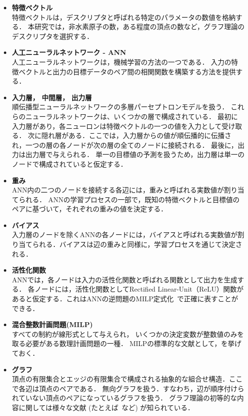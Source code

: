 \documentclass[11pt, titlepage, dvipdfmx, twoside]{jarticle}
\newcommand{\target}{目標}
\begin{document}
\begin{itemize}

\item {\bf 特徴ベクトル}\\
%
特徴ベクトルは，デスクリプタと呼ばれる特定のパラメータの数値を格納する．
本研究では，非水素原子の数，ある程度の頂点の数など，グラフ理論のデスクリプタを選択する．

\item {\bf 人工ニューラルネットワーク - ANN}\\
%
人工ニューラルネットワークは，機械学習の方法の一つである．
入力の特徴ベクトルと出力の\target データのペア間の相関関数を構築する方法を提供する．


\item {\bf 入力層， 中間層， 出力層}\\
%
順伝播型ニューラルネットワークの多層パーセプトロンモデルを扱う．
これらのニューラルネットワークは、いくつかの層で構成されている．
最初に入力層があり，各ニューロンは特徴ベクトルの一つの値を入力として受け取る．
次に隠れ層がある．ここでは，入力層からの値が順伝播的に伝播され，一つの層の各ノードが次の層の全てのノードに接続される．
最後に，出力は出力層で与えられる．
単一の\target 値の予測を扱うため，出力層は単一のノードで構成されていると仮定する．

\item {\bf 重み}\\
%
ANN内の二つのノードを接続する各辺には，重みと呼ばれる実数値が割り当てられる．
ANNの学習プロセスの一部で，既知の特徴ベクトルと\target 値のペアに基づいて，それぞれの重みの値を決定する．

\item {\bf バイアス}\\
入力層のノードを除くANNの各ノードには，バイアスと呼ばれる実数値が割り当てられる．バイアスは辺の重みと同様に，学習プロセスを通じて決定される．


\item {\bf 活性化関数}\\
%
ANNでは，各ノードは入力の活性化関数と呼ばれる関数として出力を生成する．
各ノードには，活性化関数としてRectified Linear-Unit（ReLU）関数があると仮定する．これはANNの逆問題のMILP定式化~\cite{AN19}で正確に表すことができる．

\item {\bf 混合整数計画問題(MILP)}\\
%
すべての制約が線形式として与えられ，
いくつかの決定変数が整数値のみを取る必要がある数理計画問題の一種．
MILPの標準的な文献として，\cite{LP}を挙げておく． 

\item {\bf グラフ}\\
頂点の有限集合とエッジの有限集合で構成される抽象的な組合せ構造．ここで各辺は頂点のペアである．
無向グラフを扱う．すなわち，辺が順序付けられていない頂点のペアになっているグラフを扱う．
グラフ理論の初等的な内容に関しては様々な文献 (たとえば~\cite{graph}など) が知られている．

\end{itemize}
\end{document}
